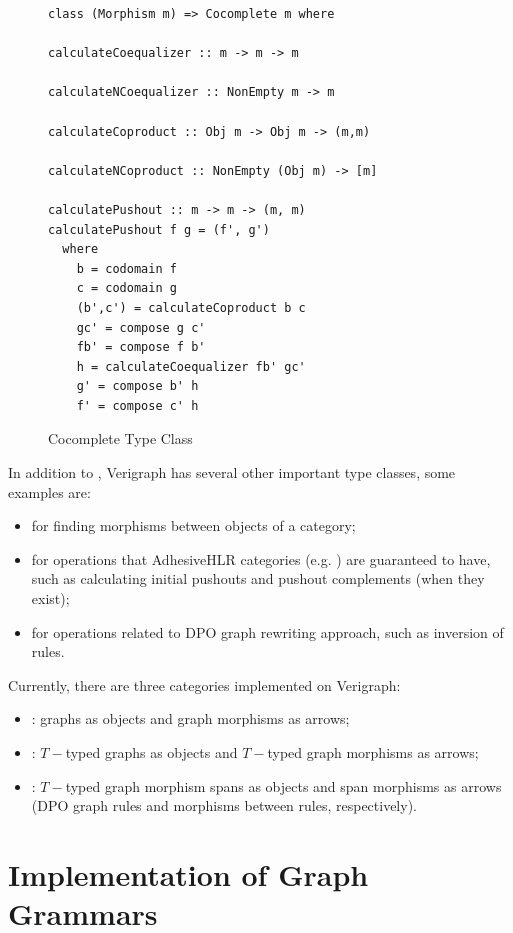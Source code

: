 \begin{figure}[!ht]
  \begin{verbatim}
class (Morphism m) => Cocomplete m where

calculateCoequalizer :: m -> m -> m

calculateNCoequalizer :: NonEmpty m -> m

calculateCoproduct :: Obj m -> Obj m -> (m,m)

calculateNCoproduct :: NonEmpty (Obj m) -> [m]

calculatePushout :: m -> m -> (m, m)
calculatePushout f g = (f', g')
  where
    b = codomain f
    c = codomain g
    (b',c') = calculateCoproduct b c
    gc' = compose g c'
    fb' = compose f b'
    h = calculateCoequalizer fb' gc'
    g' = compose b' h
    f' = compose c' h
\end{verbatim}
\caption{Cocomplete Type Class}\label{fig:verigraph:cocomplete-type-class}
\end{figure}

In addition to , Verigraph has several other important type classes, some examples are:
\begin{itemize}
  \item {} for finding morphisms between objects of a category;
  \item {} for operations that AdhesiveHLR categories (e.g. ) are guaranteed to have, such as calculating initial pushouts and pushout complements (when they exist);
  \item {} for operations related to DPO graph rewriting approach, such as inversion of rules.
\end{itemize}

Currently, there are three categories implemented on Verigraph: 

\begin{itemize}
  \item {}: graphs as objects and graph morphisms as arrows; 
  \item {}: $T-$typed graphs as objects and $T-$typed graph morphisms as arrows; 
  \item {}: $T-$typed graph morphism spans as objects and span morphisms as arrows (DPO graph rules and morphisms between rules, respectively).
\end{itemize}

\section{Implementation of Graph Grammars}

